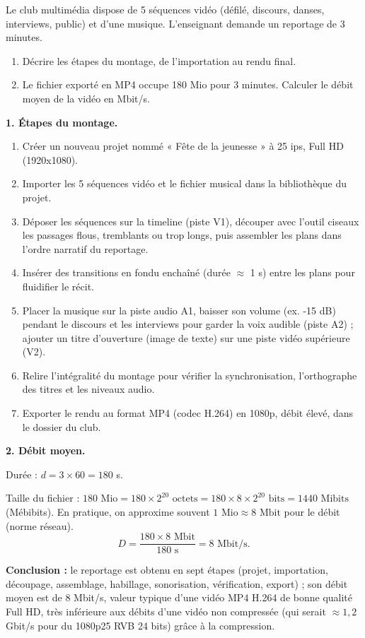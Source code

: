 \documentclass[11pt]{article}
\begin{document}
\begin{exoresolu}
Le club multimédia dispose de 5 séquences vidéo (défilé, discours, danses, interviews, public) et d'une musique. L'enseignant demande un reportage de 3 minutes.
\begin{enumerate}
  \item Décrire les étapes du montage, de l'importation au rendu final.
  \item Le fichier exporté en MP4 occupe 180 Mio pour 3 minutes. Calculer le débit moyen de la vidéo en Mbit/s.
\end{enumerate}
\tcblower
\textbf{1. Étapes du montage.}

\begin{enumerate}
  \item Créer un nouveau projet nommé « Fête de la jeunesse » à 25 ips, Full HD (1920x1080).
  \item Importer les 5 séquences vidéo et le fichier musical dans la bibliothèque du projet.
  \item Déposer les séquences sur la timeline (piste V1), découper avec l'outil ciseaux les passages flous, tremblants ou trop longs, puis assembler les plans dans l'ordre narratif du reportage.
  \item Insérer des transitions en fondu enchaîné (durée $\approx$ 1 s) entre les plans pour fluidifier le récit.
  \item Placer la musique sur la piste audio A1, baisser son volume (ex. -15 dB) pendant le discours et les interviews pour garder la voix audible (piste A2) ; ajouter un titre d'ouverture (image de texte) sur une piste vidéo supérieure (V2).
  \item Relire l'intégralité du montage pour vérifier la synchronisation, l'orthographe des titres et les niveaux audio.
  \item Exporter le rendu au format MP4 (codec H.264) en 1080p, débit élevé, dans le dossier du club.
\end{enumerate}

\textbf{2. Débit moyen.}

Durée : $d = 3 \times 60 = 180$ s.

Taille du fichier : $180 \text{ Mio} = 180 \times 2^{20} \text{ octets} = 180 \times 8 \times 2^{20} \text{ bits} = 1440 \text{ Mibits}$ (Mébibits).
En pratique, on approxime souvent $1 \text{ Mio} \approx 8 \text{ Mbit}$ pour le débit (norme réseau).
\[ D = \frac{180 \times 8 \text{ Mbit}}{180 \text{ s}} = 8 \text{ Mbit/s.} \]

\textbf{Conclusion :} le reportage est obtenu en sept étapes (projet, importation, découpage, assemblage, habillage, sonorisation, vérification, export) ; son débit moyen est de 8 Mbit/s, valeur typique d'une vidéo MP4 H.264 de bonne qualité Full HD, très inférieure aux débits d'une vidéo non compressée (qui serait $\approx 1,2$ Gbit/s pour du 1080p25 RVB 24 bits) grâce à la compression.
\end{exoresolu}
\end{document}

